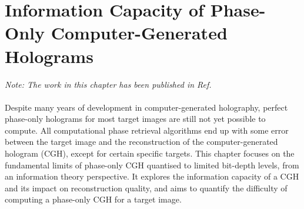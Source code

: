 \chapter{Information Capacity of Phase-Only Computer-Generated Holograms}
\label{chapter:information capacity}

\graphicspath{{Chapter_Information_capacity/Figs/}}

\textit{Note: The work in this chapter has been published in Ref. \cite{Sha2024}}\\\\

Despite many years of development in computer-generated holography, perfect phase-only holograms for most target images are still not yet possible to compute. All computational phase retrieval algorithms end up with some error between the target image and the reconstruction of the computer-generated hologram (CGH), except for certain specific targets. This chapter focuses on the fundamental limits of phase-only CGH quantised to limited bit-depth levels, from an information theory perspective. It explores the information capacity of a CGH and its impact on reconstruction quality, and aims to quantify the difficulty of computing a phase-only CGH for a target image.



